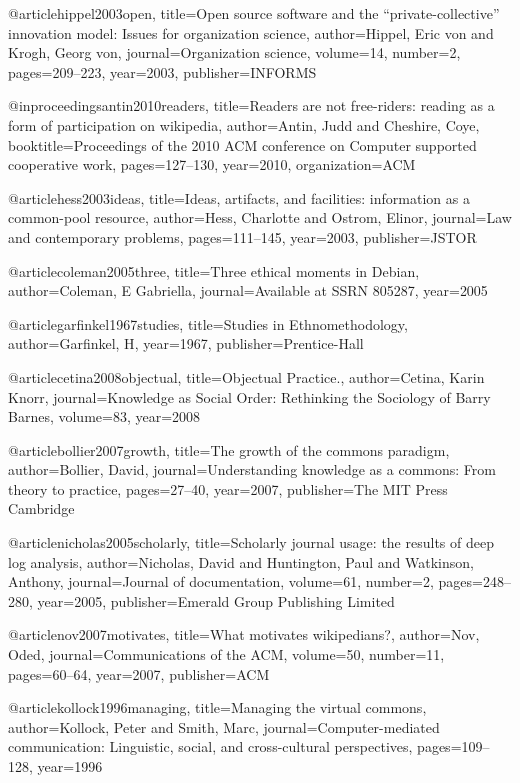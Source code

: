 @article{hippel2003open,
  title={Open source software and the “private-collective” innovation model: Issues for organization science},
  author={Hippel, Eric von and Krogh, Georg von},
  journal={Organization science},
  volume={14},
  number={2},
  pages={209--223},
  year={2003},
  publisher={INFORMS}
}

@inproceedings{antin2010readers,
  title={Readers are not free-riders: reading as a form of participation on wikipedia},
  author={Antin, Judd and Cheshire, Coye},
  booktitle={Proceedings of the 2010 ACM conference on Computer supported cooperative work},
  pages={127--130},
  year={2010},
  organization={ACM}
}

@article{hess2003ideas,
  title={Ideas, artifacts, and facilities: information as a common-pool resource},
  author={Hess, Charlotte and Ostrom, Elinor},
  journal={Law and contemporary problems},
  pages={111--145},
  year={2003},
  publisher={JSTOR}
}


@article{coleman2005three,
  title={Three ethical moments in Debian},
  author={Coleman, E Gabriella},
  journal={Available at SSRN 805287},
  year={2005}
}

@article{garfinkel1967studies,
  title={Studies in Ethnomethodology},
  author={Garfinkel, H},
  year={1967},
  publisher={Prentice-Hall}
}

@article{cetina2008objectual,
  title={Objectual Practice.},
  author={Cetina, Karin Knorr},
  journal={Knowledge as Social Order: Rethinking the Sociology of Barry Barnes},
  volume={83},
  year={2008}
}

@article{bollier2007growth,
  title={The growth of the commons paradigm},
  author={Bollier, David},
  journal={Understanding knowledge as a commons: From theory to practice},
  pages={27--40},
  year={2007},
  publisher={The MIT Press Cambridge}
}


@article{nicholas2005scholarly,
  title={Scholarly journal usage: the results of deep log analysis},
  author={Nicholas, David and Huntington, Paul and Watkinson, Anthony},
  journal={Journal of documentation},
  volume={61},
  number={2},
  pages={248--280},
  year={2005},
  publisher={Emerald Group Publishing Limited}
}



@article{nov2007motivates,
  title={What motivates wikipedians?},
  author={Nov, Oded},
  journal={Communications of the ACM},
  volume={50},
  number={11},
  pages={60--64},
  year={2007},
  publisher={ACM}
}


@article{kollock1996managing,
  title={Managing the virtual commons},
  author={Kollock, Peter and Smith, Marc},
  journal={Computer-mediated communication: Linguistic, social, and cross-cultural perspectives},
  pages={109--128},
  year={1996}
}

